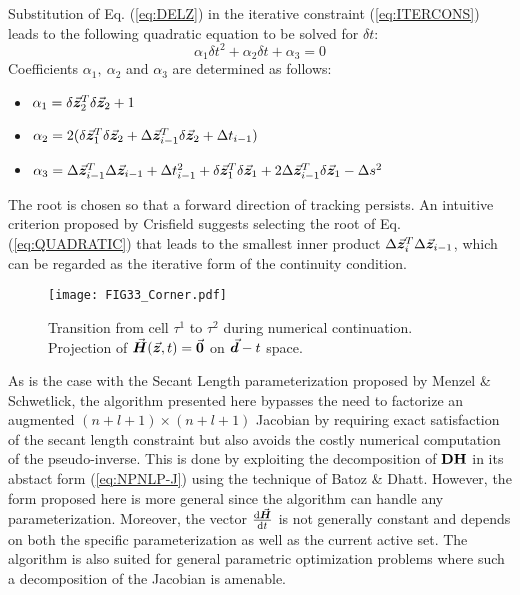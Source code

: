 \noindent Substitution of Eq. (\ref{eq:DELZ}) in the iterative constraint 
(\ref{eq:ITERCONS}) leads to
the following quadratic equation to be solved for $\delta t$:
\begin{equation}
	\alpha_1\delta t^2+\alpha_2\delta t+\alpha_3=0
	\label{eq:QUADRATIC}
\end{equation}
Coefficients $\alpha_1,\ \alpha_2$ and $\alpha_3$ are determined as follows:
\begin{itemize}
	\item $\alpha_1 = \delta\vec{\bm{z}}_2^T\delta\vec{\bm{z}}_2+1$
	\item $\alpha_2 =
	2(\delta\vec{\bm{z}}_1^T\delta\vec{\bm{z}}_2+\Delta\vec{\bm{z}}_{i-1}^T\delta\vec{\bm{z}}_2+\Delta
	 t_{i-1})$
	\item $\alpha_3 = \Delta\vec{\bm{z}}_{i-1}^T\Delta\vec{\bm{z}}_{i-1} +
	\Delta t^2_{i-1}+
	\delta\vec{\bm{z}}^T_1\delta\vec{\bm{z}}_1+2\Delta\vec{\bm{z}}_{i-1}^T\delta\vec{\bm{z}}_1-\Delta
	s^2$
\end{itemize}
The root is chosen so that a forward direction of tracking persists. An
intuitive criterion proposed by Crisfield\cite{Crisfield3} suggests 
selecting
the root of Eq. (\ref{eq:QUADRATIC}) that leads to the smallest inner product
$\Delta\vec{\bm{z}}_i^T\Delta\vec{\bm{z}}_{i-1}$, which can be regarded as the iterative
form of the continuity condition.

\begin{figure}[t]
	\centering
	\texttt{[image: FIG33\_Corner.pdf]}
	\caption{Transition from cell $\tau^1$ to $\tau^2$ during numerical
		continuation. Projection of $\vec{\bm{H}}(\vec{\bm{z}},t)=\vec{\bm{0}}$ on
		$\vec{\bm{d}}-t$ space.}
	\label{fig:FIG33_CORNER}
\end{figure}

As is the case with the Secant Length parameterization proposed by Menzel \&
Schwetlick\cite{Menzel:1985}, the algorithm presented here bypasses the need to 
factorize an 
augmented $(n+l+1)\times(n+l+1)$ Jacobian by requiring exact satisfaction of 
the secant
length constraint but also avoids the costly numerical computation of the
pseudo-inverse. This is done by exploiting the decomposition of 
$\mathbf{DH}$ in its abstact form (\ref{eq:NPNLP-J}) using the technique of Batoz 
\& Dhatt\cite{Batoz:1979}. However, the form proposed here is more
general since the algorithm can handle any parameterization.  Moreover, the
vector $\frac{\text{d}\vec{\bm{H}}}{\text{d}t}$ is not generally constant and 
depends on both the
specific parameterization as well as the current active set. The
algorithm is also suited for general parametric optimization problems where 
such a decomposition of the Jacobian is amenable.


